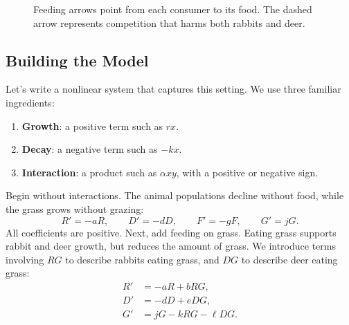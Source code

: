 \documentclass[10pt,letterpaper]{article}
\begin{document}
\begin{figure}[H]
\centering
{}
\caption{Feeding arrows point from each consumer to its food.
The dashed arrow represents competition that harms both
rabbits and deer.}
\label{fig:population-interactions}
\end{figure}

\subsection{Building the Model}

Let's write a nonlinear system that captures this setting.
We use three familiar ingredients:
\begin{enumerate}
    \item \textbf{Growth}: a positive term such as $rx$.
    \item \textbf{Decay}: a negative term such as $-kx$.
    \item \textbf{Interaction}: a product such as
    $\alpha xy$, with a positive or negative sign.
\end{enumerate}

Begin without interactions. The animal populations
decline without food, while the grass grows without grazing:
\[
R'=-aR,\qquad D'=-dD,\qquad
F'=-gF,\qquad G'=jG.
\]
All coefficients are positive. Next, add feeding on grass. Eating grass supports
rabbit and deer growth, but reduces the amount of grass. We introduce terms involving $RG$ to describe rabbits eating grass, and $DG$ to describe deer eating grass:
\[
\begin{aligned}
R'&=-aR+bRG,\\
D'&=-dD+eDG,\\
G'&=jG-kRG-\ell DG.
\end{aligned}
\]
\end{document}
